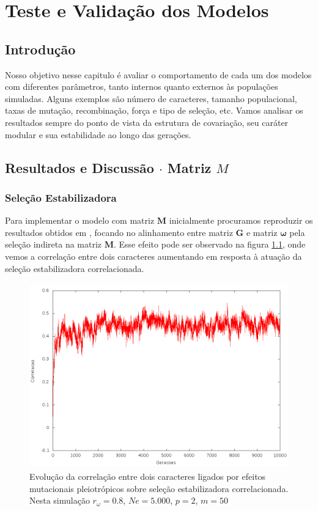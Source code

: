 \pagestyle{empty}
\cleardoublepage
\pagestyle{fancy}
\chapter{Teste e Validação dos Modelos}\label{cap3}

\section{Introdução}

Nosso objetivo nesse capitulo é avaliar o comportamento de cada um dos
modelos com diferentes parâmetros, tanto internos quanto
externos às populações simuladas.
Alguns exemplos são número de caracteres, tamanho populacional, taxas de
mutação, recombinação, força e tipo de seleção, etc.
Vamos analisar os resultados sempre do ponto de vista da estrutura de
covariação, seu caráter modular e sua estabilidade ao longo das
gerações.

\section{Resultados e Discussão $\cdot$ Matriz $M$}\label{cap3:ModelM}

\subsection{Seleção Estabilizadora}

Para implementar o modelo com matriz $\mathbf{M}$ inicialmente procuramos
reproduzir os resultados obtidos em \cite{Jones2007}, focando no
alinhamento entre matriz $\mathbf{G}$ e matriz $\pmb{\omega}$ pela seleção indireta na
matriz $\mathbf{M}$.
Esse efeito pode ser observado na figura \ref{jones2tracos}, onde vemos
a correlação entre dois caracteres aumentando em resposta à atuação da
seleção estabilizadora correlacionada.

\begin{figure}[htbp]
    \centering
    \includegraphics[width=150mm, height=80mm]{figuras/jones2tracos.png}
    \caption{Evolução da correlação entre dois caracteres ligados por efeitos
    mutacionais pleiotrópicos sobre seleção estabilizadora correlacionada.
    Nesta simulação $r_\omega=0.8$, $Ne=5.000$, $p=2$, $m=50$}
    \label{jones2tracos}
\end{figure}

